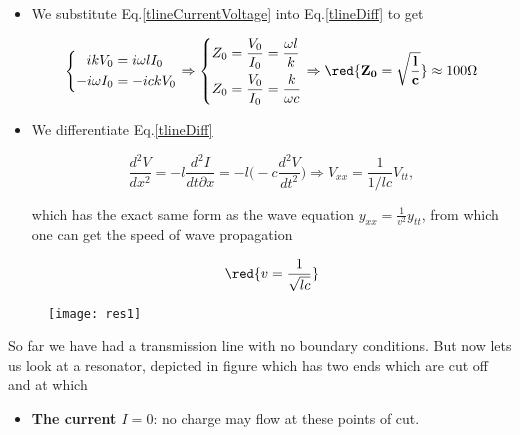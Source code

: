  \begin{itemize}
 \item    We     substitute    Eq.\eqref{tlineCurrentVoltage}    into
   Eq.\eqref{tlineDiff} to get

  \begin{equation}
    \left\lbrace \begin{aligned}
        ikV_0&=i\omega lI_0\\
        -i\omega I_0 & = -ickV_0
      \end{aligned}\right. \Rightarrow\left\lbrace \begin{aligned}
        Z_0&=\frac{V_0}{I_0} = \frac{\omega l }{k}\\
        Z_0&=\frac{V_0}{I_0} = \frac{k}{\omega c}\\
      \end{aligned}\right.  \Rightarrow \red{\mathbf{Z_0 =
        \sqrt{\frac{l}{c}}}}\approx
    100\Omega
  \end{equation}

\item We differentiate Eq.\eqref{tlineDiff}

  \begin{equation}
    \frac{d^2V}{dx^2} = -l\frac{d^2I}{dt\partial x} = -l\bigg(-c\frac{d^2V}{dt^2}\bigg) \Rightarrow V_{xx} = \frac{1}{1/lc}V_{tt},
  \end{equation}

  \noindent  which has  the  exact  same form  as  the wave  equation
  $ y_{xx}=\frac{1}{v^2}y_{tt} $, from which one can get the speed of
  wave propagation

  \begin{equation}
    \red{v=\frac{1}{\sqrt{lc}}}
  \end{equation}
\end{itemize}

\begin{figure}[h]
  \centering%
  \texttt{[image: res1]}%
  \caption{\label{tlineres1}}
\end{figure}

So  far   we  have   had  a  transmission   line  with   no  boundary
conditions. But now  lets us look at a resonator,  depicted in figure
which has two ends which are cut off and at which

\begin{itemize}
\item  \textbf{The current  $ I=0  $}: no  charge may  flow at  these
  points of cut.
\end{itemize}

